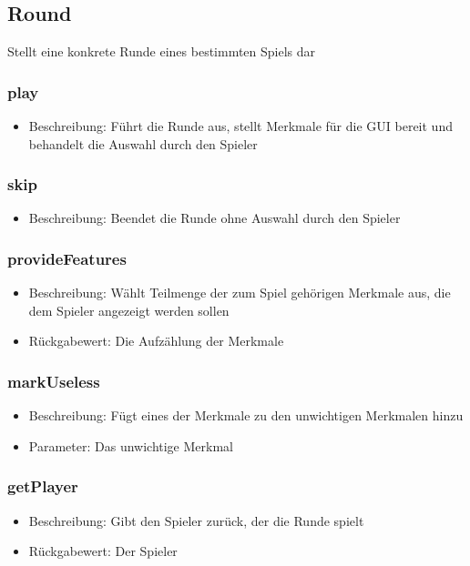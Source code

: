 \documentclass[a4paper]{scrreprt}
\begin{document}
	\subsection{Round}
	Stellt eine konkrete Runde eines bestimmten Spiels dar
	\subsubsection{play}
	\begin{itemize}
		\item Beschreibung: Führt die Runde aus, stellt Merkmale für die GUI bereit und behandelt die Auswahl durch den Spieler
	\end{itemize}
	\subsubsection{skip}
	\begin{itemize}
		\item Beschreibung: Beendet die Runde ohne Auswahl durch den Spieler
	\end{itemize}
	\subsubsection{provideFeatures}
	\begin{itemize}
		\item Beschreibung: Wählt Teilmenge der zum Spiel gehörigen Merkmale aus, die dem Spieler angezeigt werden sollen
		\item Rückgabewert: Die Aufzählung der Merkmale
	\end{itemize}
	\subsubsection{markUseless}
	\begin{itemize}
		\item Beschreibung: Fügt eines der Merkmale zu den unwichtigen Merkmalen hinzu
		\item Parameter: Das unwichtige Merkmal
	\end{itemize}
	\subsubsection{getPlayer}
	\begin{itemize}
		\item Beschreibung: Gibt den Spieler zurück, der die Runde spielt
		\item Rückgabewert: Der Spieler
	\end{itemize}
\end{document}
